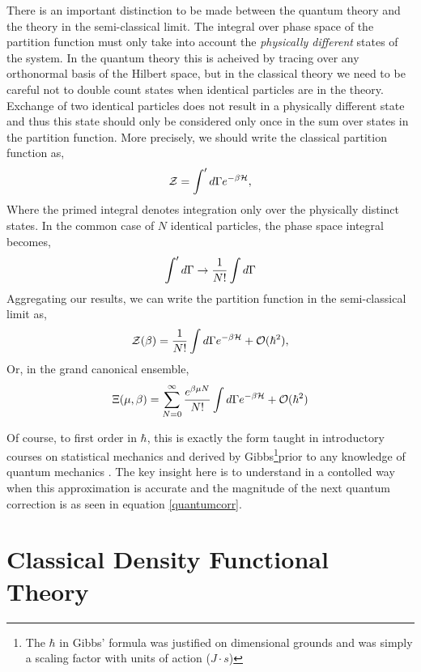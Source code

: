 There is an important distinction to be made between the quantum theory and the
theory in the semi-classical limit.  The integral over phase space of the
partition function must only take into account the \textit{physically
different} states of the system.  In the quantum theory this is acheived by
tracing over any orthonormal basis of the Hilbert space, but in the classical
theory we need to be careful not to double count states when identical
particles are in the theory.  Exchange of two identical particles does not
result in a physically different state and thus this state should only be
considered only once in the sum over states in the partition function.  More
precisely, we should write the classical partition function as,
%
\begin{equation} \mathcal{Z} = \int^\prime d\Gamma e^{-\beta \mathcal{H}}, \end{equation}
%
Where the primed integral denotes integration only over the physically distinct
states. In the common case of $N$ identical particles, the phase space integral
becomes, 
%
\begin{equation} \int^\prime d\Gamma \rightarrow \frac{1}{N!}\int d\Gamma
\end{equation}
%
Aggregating our results, we can write the partition function in the
semi-classical limit as,
%
\begin{equation}
    \mathcal{Z}(\beta) = \frac{1}{N!}\int d\Gamma e^{-\beta \mathcal{H}} + \mathcal{O}(\hbar ^ 2),
\end{equation}
%
Or, in the grand canonical ensemble,
%
\begin{equation} 
    \Xi(\mu, \beta) = \sum_{N = 0}^\infty \frac{e^{\beta\mu N}}{N!}
        \int d\Gamma e^{-\beta \mathcal{H}} + \mathcal{O}(\hbar^2) 
\end{equation}

Of course, to first order in $\hbar$, this is exactly the form taught in
introductory courses on statistical mechanics and derived by Gibbs\footnote{The
$\hbar$ in Gibbs' formula was justified on dimensional grounds and was simply a
scaling factor with units of action ($J\cdot s$)}prior to any knowledge of
quantum mechanics \cite{Gibbs}.  The key insight here is to understand in a
contolled way when this approximation is accurate and the magnitude of the next
quantum correction is as seen in equation \ref{quantumcorr}.

\section{Classical Density Functional Theory}  %


